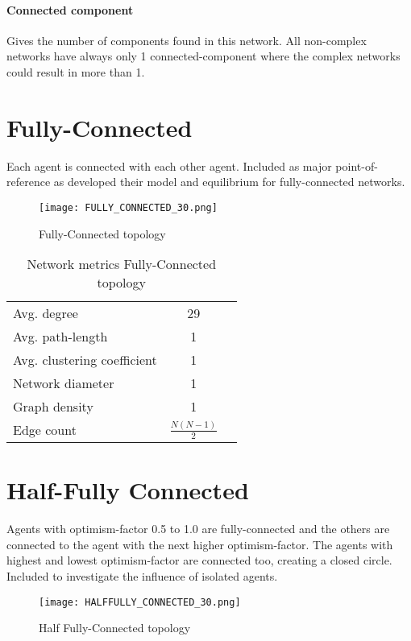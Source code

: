 \documentclass[Bachelorarbeit.tex]{subfiles}
\begin{document}
\paragraph{Connected component} Gives the number of components found in this network. All non-complex networks have always only 1 connected-component where the complex networks could result in more than 1.

\section{Fully-Connected}

Each agent is connected with each other agent.
\medskip
Included as major point-of-reference as \cite{Breuer2015} developed their model and equilibrium for fully-connected networks.

\begin{figure}[H]
	\centering
  \texttt{[image: FULLY\_CONNECTED\_30.png]}
	\caption{Fully-Connected topology}
	\label{fig:topology_FULLY_CONNECTED_30}
\end{figure}

\begin{table}[h]
	\centering
	\caption{Network metrics Fully-Connected topology}
	\begin{tabular} { l c r }
		\hline
		Avg. degree & 29 \\
		Avg. path-length & 1 \\
		Avg. clustering coefficient & 1 \\
		Network diameter & 1 \\
		Graph density & 1 \\
		Edge count & $\frac{N(N - 1)}{2}$ \\
		\hline
	\end{tabular}
\end{table}

\section{Half-Fully Connected}
Agents with optimism-factor 0.5 to 1.0 are fully-connected and the others are connected to the agent with the next higher optimism-factor. The agents with highest and lowest optimism-factor are connected too, creating a closed circle.
\medskip
Included to investigate the influence of isolated agents.

\begin{figure}[H]
	\centering
  \texttt{[image: HALFFULLY\_CONNECTED\_30.png]}
	\caption{Half Fully-Connected topology}
	\label{fig:topology_HALFFULLY_CONNECTED_30}
\end{figure}
\end{document}
